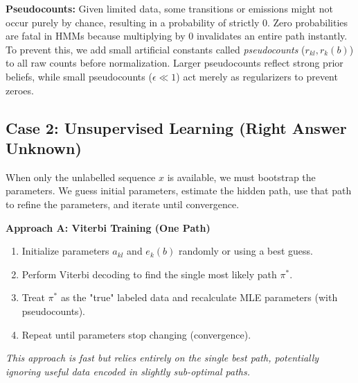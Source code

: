 \textbf{Pseudocounts:} Given limited data, some transitions or emissions might not occur purely by chance, resulting in a probability of strictly 0.
\sta Zero probabilities are fatal in HMMs because multiplying by 0 invalidates an entire path instantly. To prevent this, we add small artificial constants called \textit{pseudocounts} ($r_{kl}, r_k(b)$) to all raw counts before normalization. Larger pseudocounts reflect strong prior beliefs, while small pseudocounts ($\epsilon \ll 1$) act merely as regularizers to prevent zeroes.

\subsection{Case 2: Unsupervised Learning (Right Answer Unknown)}

When only the unlabelled sequence $x$ is available, we must bootstrap the parameters. We guess initial parameters, estimate the hidden path, use that path to refine the parameters, and iterate until convergence.

\textbf{Approach A: Viterbi Training (One Path)}
\begin{enumerate}
    \item Initialize parameters $a_{kl}$ and $e_k(b)$ randomly or using a best guess.
    \item Perform Viterbi decoding to find the single most likely path $\pi^*$.
    \item Treat $\pi^*$ as the "true" labeled data and recalculate MLE parameters (with pseudocounts).
    \item Repeat until parameters stop changing (convergence).
\end{enumerate}
\textit{This approach is fast but relies entirely on the single best path, potentially ignoring useful data encoded in slightly sub-optimal paths.}

